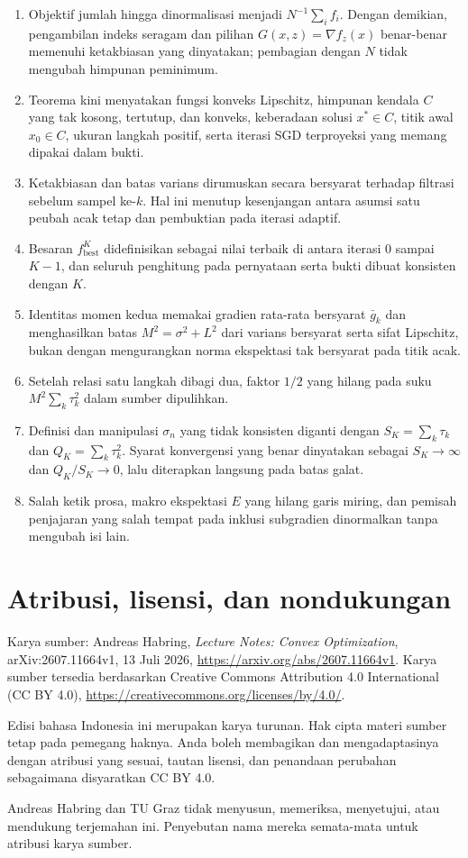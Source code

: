 \documentclass[indonesian]{shinybook}
\begin{document}
\begin{enumerate}
    \item Objektif jumlah hingga dinormalisasi menjadi $N^{-1}\sum_i f_i$. Dengan demikian, pengambilan indeks seragam dan pilihan $G(x,z)=\nabla f_z(x)$ benar-benar memenuhi ketakbiasan yang dinyatakan; pembagian dengan $N$ tidak mengubah himpunan peminimum.
    \item Teorema kini menyatakan fungsi konveks Lipschitz, himpunan kendala $C$ yang tak kosong, tertutup, dan konveks, keberadaan solusi $x^*\in C$, titik awal $x_0\in C$, ukuran langkah positif, serta iterasi SGD terproyeksi yang memang dipakai dalam bukti.
    \item Ketakbiasan dan batas varians dirumuskan secara bersyarat terhadap filtrasi sebelum sampel ke-$k$. Hal ini menutup kesenjangan antara asumsi satu peubah acak tetap dan pembuktian pada iterasi adaptif.
    \item Besaran $f_{\mathrm{best}}^K$ didefinisikan sebagai nilai terbaik di antara iterasi $0$ sampai $K-1$, dan seluruh penghitung pada pernyataan serta bukti dibuat konsisten dengan $K$.
    \item Identitas momen kedua memakai gradien rata-rata bersyarat $\bar g_k$ dan menghasilkan batas $M^2=\sigma^2+L^2$ dari varians bersyarat serta sifat Lipschitz, bukan dengan mengurangkan norma ekspektasi tak bersyarat pada titik acak.
    \item Setelah relasi satu langkah dibagi dua, faktor $1/2$ yang hilang pada suku $M^2\sum_k\tau_k^2$ dalam sumber dipulihkan.
    \item Definisi dan manipulasi $\sigma_n$ yang tidak konsisten diganti dengan $S_K=\sum_k\tau_k$ dan $Q_K=\sum_k\tau_k^2$. Syarat konvergensi yang benar dinyatakan sebagai $S_K\to\infty$ dan $Q_K/S_K\to0$, lalu diterapkan langsung pada batas galat.
    \item Salah ketik prosa, makro ekspektasi $E$ yang hilang garis miring, dan pemisah penjajaran yang salah tempat pada inklusi subgradien dinormalkan tanpa mengubah isi lain.
\end{enumerate}

\chapter*{Atribusi, lisensi, dan nondukungan}
Karya sumber: Andreas Habring, \emph{Lecture Notes: Convex Optimization}, arXiv:2607.11664v1, 13 Juli 2026, \url{https://arxiv.org/abs/2607.11664v1}. Karya sumber tersedia berdasarkan Creative Commons Attribution 4.0 International (CC BY 4.0), \url{https://creativecommons.org/licenses/by/4.0/}.

Edisi bahasa Indonesia ini merupakan karya turunan. Hak cipta materi sumber tetap pada pemegang haknya. Anda boleh membagikan dan mengadaptasinya dengan atribusi yang sesuai, tautan lisensi, dan penandaan perubahan sebagaimana disyaratkan CC BY 4.0.

Andreas Habring dan TU Graz tidak menyusun, memeriksa, menyetujui, atau mendukung terjemahan ini. Penyebutan nama mereka semata-mata untuk atribusi karya sumber.
\end{document}
